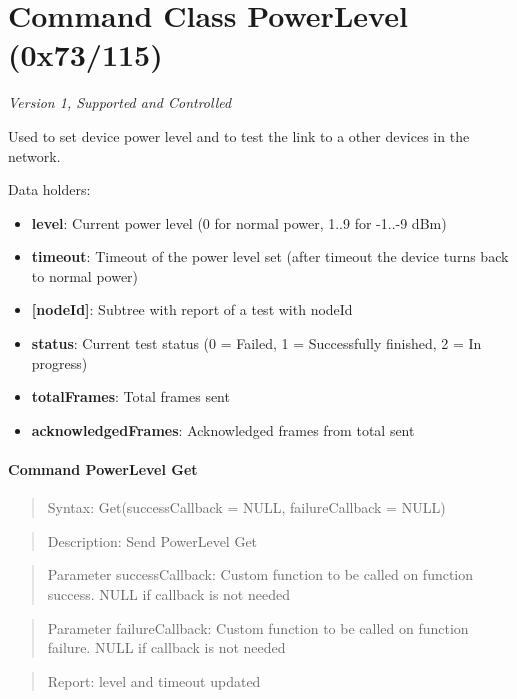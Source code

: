 \section{Command Class PowerLevel (0x73/115)}

\textit{Version 1, Supported and Controlled}
\newline

Used to set device power level and to test the link to a other devices in the network.
\newline

\noindent
Data holders:

\begin{itemize}
\item \textbf{level}: Current power level (0 for normal power, 1..9 for -1..-9 dBm)
\item \textbf{timeout}: Timeout of the power level set (after timeout the device turns back to normal power)
\item \textbf{[nodeId]}: Subtree with report of a test with nodeId
\item \qquad\textbf{status}: Current test status (0 = Failed, 1 = Successfully finished, 2 = In progress)
\item \qquad\textbf{totalFrames}: Total frames sent
\item \qquad\textbf{acknowledgedFrames}: Acknowledged frames from total sent
\end{itemize}

\paragraph{Command PowerLevel Get}
\begin{quote}Syntax: Get(successCallback = NULL, failureCallback = NULL)\end{quote}
\begin{quote}Description: Send PowerLevel Get\end{quote}
\begin{quote}Parameter successCallback: Custom function to be called on function success. NULL if callback is not needed\end{quote}
\begin{quote}Parameter failureCallback: Custom function to be called on function failure. NULL if callback is not needed\end{quote}
\begin{quote}Report: level and timeout updated\end{quote}

